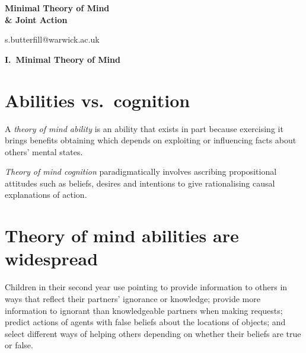\documentclass[11pt]{extarticle}
\date{}
\begin{document}
\begin{multicols}{3}

\setlength\footnotesep{1em}








\begin{center}
{\huge
\textbf{Minimal Theory of Mind \\ \& Joint Action}
}


s.butterfill@warwick.ac.uk

\end{center}




\begin{center}
{\Large
\textbf{I.\ Minimal Theory of Mind}
}
\end{center}



\section{Abilities vs.\ cognition}

A \emph{theory of mind ability} is an ability that exists in part because exercising it brings benefits obtaining which depends on exploiting or influencing facts about others’ mental states.  

\emph{Theory of mind cognition} paradigmatically involves ascribing propositional attitudes such as beliefs, desires and intentions to give rationalising causal explanations of action. 


\section{Theory of mind abilities are widespread}
Children in their second year use pointing to provide information to others\citep{Liszkowski:2006ec} in ways that reflect their partners’ ignorance or knowledge;\citep{Liszkowski:2008al} provide more information to ignorant than knowledgeable partners when making requests;\citep{ONeill:1996um}  predict actions of agents with false beliefs about the locations of objects;\citep{Onishi:2005hm,Southgate:2007js} and select different ways of helping others depending on whether their beliefs are true or false.\citep{Buttelmann:2009gy}


\end{multicols}
\end{document}
